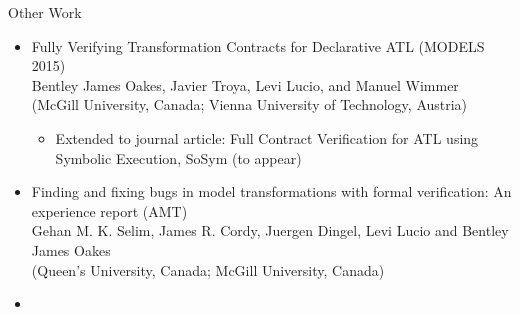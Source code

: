 \documentclass[xcolor=dvipsnames, 12pt, handout]{beamer}
\begin{document}
\begin{frame}{Other Work}
\small
\begin{itemize}[<+->]

\item Fully Verifying Transformation Contracts for Declarative ATL (MODELS 2015)\\

Bentley James Oakes, Javier Troya, Levi Lucio, and Manuel Wimmer\\
(McGill University, Canada; Vienna University of Technology, Austria)
\begin{itemize}
\item Extended to journal article: Full Contract Verification for ATL using Symbolic Execution, SoSym (to appear)
\end{itemize}
\item  Finding and fixing bugs in model transformations with formal verification: An experience report (AMT)\\
Gehan M. K. Selim, James R. Cordy, Juergen Dingel, Levi Lucio and Bentley James Oakes\\
(Queen's University, Canada; McGill University, Canada) 
\item 
\end{itemize}
\end{frame}
\end{document}
